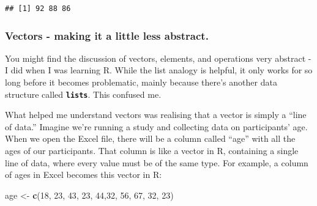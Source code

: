 \documentclass[
]{book}
\newenvironment{Shaded}{\begin{snugshade}}{\end{snugshade}}
\newcommand{\DecValTok}[1]{\textcolor[rgb]{0.00,0.00,0.81}{#1}}
\newcommand{\FunctionTok}[1]{\textcolor[rgb]{0.13,0.29,0.53}{\textbf{#1}}}
\newcommand{\NormalTok}[1]{#1}
\newcommand{\OtherTok}[1]{\textcolor[rgb]{0.56,0.35,0.01}{#1}}
\begin{document}
\begin{verbatim}
## [1] 92 88 86
\end{verbatim}

\subsubsection{Vectors - making it a little less abstract.}\label{vectors---making-it-a-little-less-abstract.}

You might find the discussion of vectors, elements, and operations very abstract - I did when I was learning R. While the list analogy is helpful, it only works for so long before it becomes problematic, mainly because there's another data structure called \textbf{\texttt{lists}}. This confused me.

What helped me understand vectors was realising that a vector is simply a ``line of data.'' Imagine we're running a study and collecting data on participants' age. When we open the Excel file, there will be a column called ``age'' with all the ages of our participants. That column is like a vector in R, containing a single line of data, where every value must be of the same type. For example, a column of ages in Excel becomes this vector in R:

\begin{Shaded}
\begin{Highlighting}[]
\NormalTok{age }\OtherTok{\textless{}{-}} \FunctionTok{c}\NormalTok{(}\DecValTok{18}\NormalTok{, }\DecValTok{23}\NormalTok{, }\DecValTok{43}\NormalTok{, }\DecValTok{23}\NormalTok{, }\DecValTok{44}\NormalTok{,}\DecValTok{32}\NormalTok{, }\DecValTok{56}\NormalTok{, }\DecValTok{67}\NormalTok{, }\DecValTok{32}\NormalTok{, }\DecValTok{23}\NormalTok{)}
\end{Highlighting}
\end{Shaded}
\end{document}
